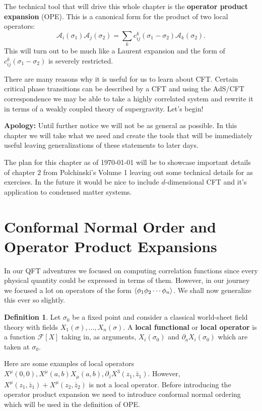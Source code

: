 \documentclass{report}
\theoremstyle{plain}
\theoremstyle{definition}
\newtheorem{definition}[theorem]{Definition}
\theoremstyle{remark}
\newcommand{\mc}{\mathcal}
\newcommand{\ms}{\mathscr}
\newcommand{\sg}{\sigma}
\newcommand{\di}{\partial}
\begin{document}
The technical tool that will drive this whole chapter is the
\textbf{operator product expansion} (OPE). This is a canonical form
for the product of two local operators:
\[ \mc A_i(\sg_1)\mc A_j(\sg_2) = \sum_k c^k_{ij}(\sg_1-\sg_2) \mc A_k(\sg_2).\]
This will turn out to be much like a Laurent expansion and the form of
$c^k_{ij}(\sg_1-\sg_2)$ is severely restricted.

There are many reasons why it is useful for us to learn about CFT. Certain
critical phase transitions can be described by a CFT and using the AdS/CFT
correspondence we may be able to take a highly correlated system and
rewrite it in terms of a weakly coupled theory of supergravity. Let's
begin!

\textbf{Apology:} Until further notice we will not be as general as
possible. In this chapter we will take what we need and create the tools
that will be immediately useful leaving generalizations of these statements
to later days.

The plan for this chapter as of \today{} will be to showcase important
details of chapter $2$ from Polchinski's Volume 1 leaving out some
technical details for as exercises. In the future it would be nice to
include $d$-dimensional CFT and it's application to condensed matter
systems.

\section{Conformal Normal Order and Operator Product Expansions}

In our QFT adventures we focused on computing correlation functions since
every physical quantity could be expressed in terms of them. However, in
our journey we focused a lot on operators of the form
$\braket{\phi_1\phi_2\cdots\phi_n}$. We shall now generalize this ever so
slightly. 

\begin{definition} Let $\sg_0$ be a fixed point and consider a classical
world-sheet field theory with fields $X_1(\sg),\ldots,X_n(\sg)$. A
\textbf{local functional} or \textbf{local operator} is a function
$\ms F[X]$ taking in, as arguments, $X_i(\sg_0)$ and $\di_a
X_i(\sg_0)$ which are taken at $\sg_0$.
\end{definition}
Here are some examples of local operators $X^\mu(0,0),
X^\mu(a,b)X_\mu(a,b), \di_{\bar z}X^3(z_1,\bar z_1)$. However,
$X^\mu(z_1,\bar z_1)+X^\mu(z_2,\bar z_2)$ is not a local operator.  Before
introducing the operator product expansion we need to introduce conformal
normal ordering which will be used in the definition of OPE.
\end{document}
